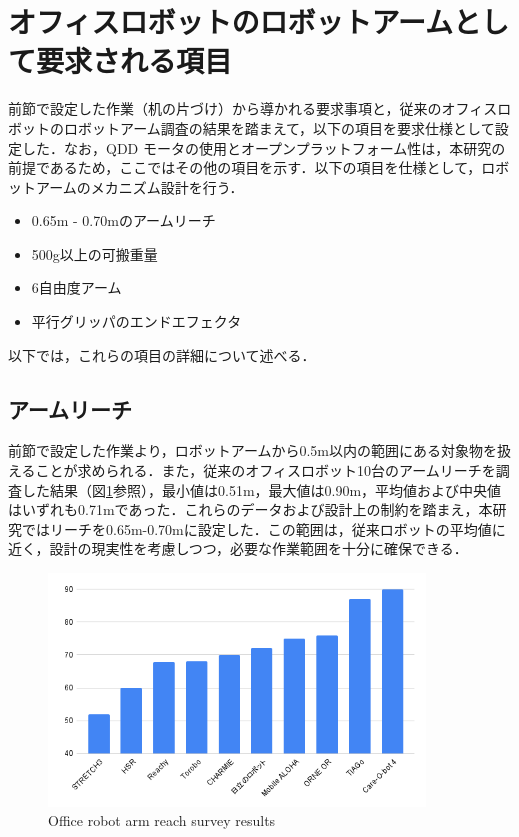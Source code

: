 \section{オフィスロボットのロボットアームとして要求される項目}
前節で設定した作業（机の片づけ）から導かれる要求事項と，従来のオフィスロボットのロボットアーム調査の結果を踏まえて，以下の項目を要求仕様として設定した．なお，QDD モータの使用とオープンプラットフォーム性は，本研究の前提であるため，ここではその他の項目を示す．以下の項目を仕様として，ロボットアームのメカニズム設計を行う．
\begin{itemize}
  \item 0.65m - 0.70mのアームリーチ
  \item 500g以上の可搬重量
  \item 6自由度アーム
  \item 平行グリッパのエンドエフェクタ
\end{itemize}
以下では，これらの項目の詳細について述べる．

\subsection{アームリーチ}
前節で設定した作業より，ロボットアームから0.5m以内の範囲にある対象物を扱えることが求められる．また，従来のオフィスロボット10台のアームリーチを調査した結果（図\ref{fig:reach}参照），最小値は0.51m，最大値は0.90m，平均値および中央値はいずれも0.71mであった．これらのデータおよび設計上の制約を踏まえ，本研究ではリーチを0.65m-0.70mに設定した．この範囲は，従来ロボットの平均値に近く，設計の現実性を考慮しつつ，必要な作業範囲を十分に確保できる．
\begin{figure}[h]
  \centering
  \includegraphics[width=10cm]{images/2syou/reach.png}
  \caption{Office robot arm reach survey results}
  \label{fig:reach}
\end{figure}

